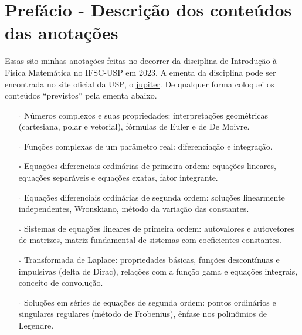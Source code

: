 \documentclass[letterpaper, 12pt]{book}
\begin{document}
\maketitle
\setcounter{tocdepth}{1} \tableofcontents
\dominitoc\setcounter{tocdepth}{1}

\chapter*{Prefácio - Descrição dos conteúdos das anotações}
Essas são minhas anotações feitas no decorrer da disciplina de Introdução à Física Matemática no
IFSC-USP em 2023.
A ementa da disciplina pode ser encontrada no site oficial da USP, o
\href{https://uspdigital.usp.br/jupiterweb/obterDisciplina?sgldis=7600016&codcur=76041&codhab=0}{jupiter}.
De qualquer forma coloquei os conteúdos ``previstos'' pela ementa abaixo.
\begin{itemize}
\item[\rlap{\raisebox{0.3ex}{\hspace{0.4ex}\tiny \ding{52}}}$\square$] Números complexos e suas propriedades: interpretações geométricas (cartesiana, polar e vetorial), fórmulas de Euler e de De Moivre. 
\item[\rlap{\raisebox{0.3ex}{\hspace{0.4ex}\tiny \ding{52}}}$\square$] Funções complexas de um parâmetro real: diferenciação e integração. 
\item[\rlap{\raisebox{0.3ex}{\hspace{0.4ex}\tiny \ding{52}}}$\square$] Equações diferenciais ordinárias de primeira ordem: equações lineares, equações separáveis e equações exatas, fator integrante. 
\item[\rlap{\raisebox{0.3ex}{\hspace{0.4ex}\tiny \ding{52}}}$\square$] Equações diferenciais ordinárias de segunda ordem: soluções linearmente independentes, Wronskiano, método da variação das constantes. 
\item[\rlap{\raisebox{0.3ex}{\hspace{0.4ex}\tiny \ding{52}}}$\square$] Sistemas de equações lineares de primeira ordem: autovalores e autovetores de matrizes, matriz fundamental de sistemas com coeficientes constantes. 
\item[\rlap{\raisebox{0.3ex}{\hspace{0.4ex}\tiny \ding{52}}}$\square$] Transformada de Laplace: propriedades básicas, funções descontínuas e impulsivas (delta de Dirac), relações com a função gama e equações integrais, conceito de convolução. 
\item[\rlap{\raisebox{0.3ex}{\hspace{0.4ex}\tiny \ding{52}}}$\square$] Soluções em séries de equações de segunda ordem: pontos ordinários e singulares regulares (método de Frobenius), ênfase nos polinômios de Legendre.
\end{itemize}
\end{document}
